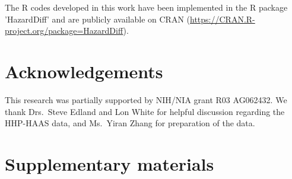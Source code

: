 \documentclass[11pt]{article}
\begin{document}
The R codes developed in this work have been implemented in the R package 'HazardDiff' and are publicly available on CRAN (\url{https://CRAN.R-project.org/package=HazardDiff}).


\section*{Acknowledgements}
This research was partially supported by  NIH/NIA grant R03 AG062432. We thank Drs.~Steve Edland and Lon White for helpful discussion regarding the HHP-HAAS data, and Ms.~Yiran Zhang for preparation of the data.


\section{Supplementary materials}
\newtheorem{assumptionS}{Assumption}\setcounter{assumptionS}{+1}
\newtheorem{lemmas}{Lemma}\setcounter{lemmas}{+1}

\newtheorem{remark}{Remark}
\newenvironment{assumptionA}
  {\par\noindent
   \refstepcounter{assA}%
   A\textsc{ssumption }A\theassA.~\itshape\ignorespaces}
  {\par\ignorespacesafterend}
  
\newenvironment{assumptionB}
  {\par\noindent
   \refstepcounter{assB}%
   A\textsc{ssumption }B\theassB.~\itshape\ignorespaces}
  {\par\ignorespacesafterend}
  
\newenvironment{assumptionC}
  {\par\noindent
   \refstepcounter{assC}%
   A\textsc{ssumption }C\theassC.~\itshape\ignorespaces}
  {\par\ignorespacesafterend}
  
\newenvironment{assumptionA*}
  {\par\noindent
   \refstepcounter{assAn}%
   A\textsc{ssumption }A*\theassAn.~\itshape\ignorespaces}
  {\par\ignorespacesafterend}
  
\newenvironment{assumptionB*}
  {\par\noindent
   \refstepcounter{assBn}%
   A\textsc{ssumption }B*\theassBn.~\itshape\ignorespaces}
  {\par\ignorespacesafterend}
  
\newenvironment{assumptionA'}
  {\par\noindent
   \refstepcounter{assAnn}%
   A\textsc{ssumption }A'\theassAnn.~\itshape\ignorespaces}
  {\par\ignorespacesafterend}
  
\end{document}
